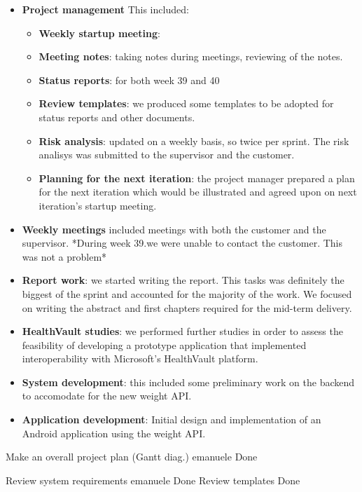 \begin{itemize}
	\item \textbf{Project management}\newline
	This included:
	\begin{itemize}
		\item \textbf{Weekly startup meeting}:
		\item \textbf{Meeting notes}:
			taking notes during meetings, reviewing of the notes.
		\item \textbf{Status reports}:
			for both week 39 and 40
		\item \textbf{Review templates}:
			we produced some templates to be adopted for status reports and other documents.
		\item \textbf{Risk analysis}:
			updated on a weekly basis, so twice per sprint.
			The risk analisys was submitted to the supervisor and the customer.
		\item \textbf{Planning for the next iteration}:
			the project manager prepared a plan for the next iteration
			which would be illustrated and agreed upon on next iteration's startup meeting.
	\end{itemize}
	\item \textbf{Weekly meetings}
		included meetings with both the customer and the supervisor.
		*During week 39.we were unable to contact the customer. This was not a problem*
	\item \textbf{Report work}:
		we started writing the report.
		This tasks was definitely the biggest of the sprint and accounted for the majority of the work.
		We focused on writing the abstract and first chapters required for the mid-term delivery.
	\item \textbf{HealthVault studies}:
		we performed further studies in order to assess the feasibility of developing a prototype
		application that implemented interoperability with Microsoft's HealthVault platform.
	\item \textbf{System development}:
		this included some preliminary work on the backend to accomodate for the new weight API.
	\item \textbf{Application development}:
		Initial design and implementation of an Android application using the weight API.

\end{itemize}



Make an overall project plan (Gantt diag.)	emanuele	Done

Review system requirements	emanuele	Done
Review templates	Done


